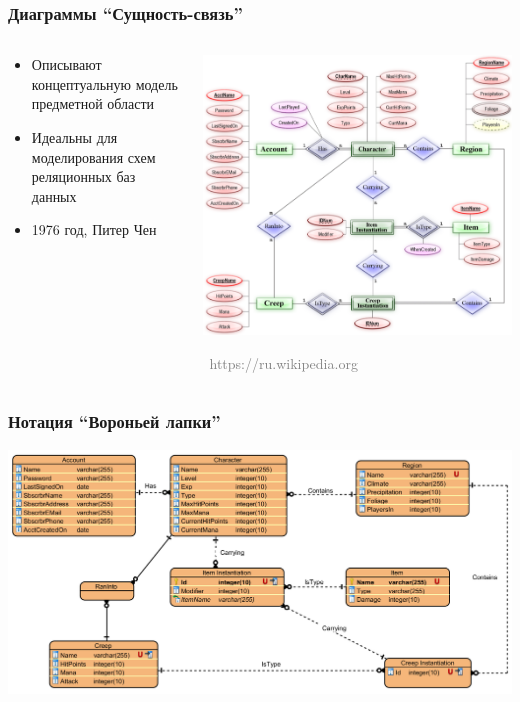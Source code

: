 \documentclass[xetex,mathserif,serif]{beamer}
\newcommand{\attribution}[1] {
	\vspace{-5mm}\begin{flushright}\begin{scriptsize}\textcolor{gray}{\textcopyright\, #1}\end{scriptsize}\end{flushright}
}
\begin{document}
	\begin{frame}
		\frametitle{Диаграммы ``Сущность-связь''}
		\begin{columns}
			\begin{column}{0.5\textwidth}
				\begin{itemize}
					\item Описывают концептуальную модель предметной области
					\item Идеальны для моделирования схем реляционных баз данных
					\item 1976 год, Питер Чен
				\end{itemize}
			\end{column}
			\begin{column}{0.5\textwidth}
				\begin{center}
					\includegraphics[width=\textwidth]{erChenNotation.png}
					\attribution{https://ru.wikipedia.org}
				\end{center}
			\end{column}
		\end{columns}
	\end{frame}

	\begin{frame}
		\frametitle{Нотация ``Вороньей лапки''}
		\begin{center}
			\includegraphics[width=\textwidth]{erCrowsFoot.png}
		\end{center}
	\end{frame}
\end{document}

